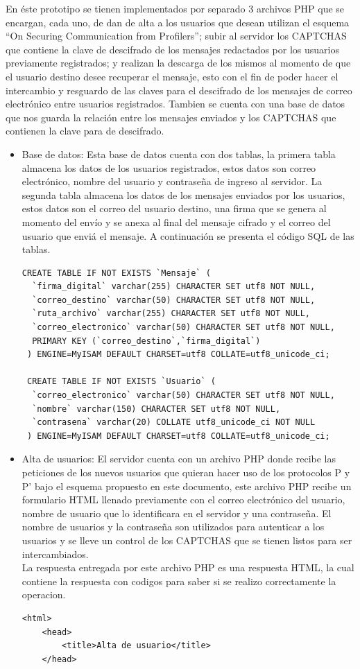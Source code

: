 \documentclass[12pt,oneside,onecolumn,openany]{report}
\begin{document}
En éste prototipo se tienen implementados por separado 3 archivos PHP que se encargan, cada uno, de dan de alta a los usuarios que desean utilizan el esquema “On Securing  Communication  from Profilers”; subir al servidor los CAPTCHAS que contiene la clave de descifrado de los mensajes redactados por los usuarios previamente registrados; y realizan la descarga de los mismos al momento de que el usuario destino desee recuperar el mensaje, esto con el fin de poder hacer el intercambio y resguardo de las claves para el descifrado de los mensajes de correo electrónico entre usuarios registrados. Tambien se cuenta con una base de datos que nos guarda la relación entre los mensajes enviados y los CAPTCHAS que contienen la clave para de descifrado.
\begin{itemize}
 \item Base de datos: Esta base de datos cuenta con dos tablas, la primera tabla almacena los datos de los usuarios registrados, estos datos son correo electrónico, nombre del usuario y contraseña de ingreso al servidor. La segunda tabla almacena los datos de los mensajes enviados por los usuarios, estos datos son el correo del usuario destino, una firma que se genera al momento del envío y se anexa al final del mensaje cifrado y el correo del usuario que enviá el mensaje. A continuación se presenta el código SQL de las tablas. \\
 \begin{lstlisting}[frame=single]
 CREATE TABLE IF NOT EXISTS `Mensaje` (
  `firma_digital` varchar(255) CHARACTER SET utf8 NOT NULL,
  `correo_destino` varchar(50) CHARACTER SET utf8 NOT NULL,
  `ruta_archivo` varchar(255) CHARACTER SET utf8 NOT NULL,
  `correo_electronico` varchar(50) CHARACTER SET utf8 NOT NULL,
  PRIMARY KEY (`correo_destino`,`firma_digital`)
 ) ENGINE=MyISAM DEFAULT CHARSET=utf8 COLLATE=utf8_unicode_ci;

 CREATE TABLE IF NOT EXISTS `Usuario` (
  `correo_electronico` varchar(50) CHARACTER SET utf8 NOT NULL,
  `nombre` varchar(150) CHARACTER SET utf8 NOT NULL,
  `contrasena` varchar(20) COLLATE utf8_unicode_ci NOT NULL
 ) ENGINE=MyISAM DEFAULT CHARSET=utf8 COLLATE=utf8_unicode_ci;
 \end{lstlisting}
 \item Alta de usuarios: El servidor cuenta con un archivo PHP donde recibe las peticiones de los nuevos usuarios que quieran hacer uso de los protocolos P y P’ bajo el esquema propuesto en este documento, este archivo PHP recibe un formulario HTML llenado previamente con el correo electrónico del usuario, nombre de usuario que lo identificara en el servidor y una contraseña. El nombre de usuarios y la contraseña son utilizados para autenticar a los usuarios y se lleve un control de los CAPTCHAS que se tienen listos para ser intercambiados. \\
 La respuesta entregada por este archivo PHP es una respuesta HTML, la cual contiene la respuesta con codigos para saber si se realizo correctamente la operacion.
 \begin{lstlisting}[frame=single]
 <html>
	<head>
		<title>Alta de usuario</title> 
	</head>


\end{lstlisting}
\end{itemize}
\end{document}
